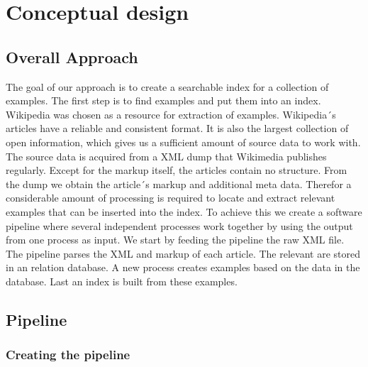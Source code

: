 
\chapter{Conceptual design}\label{cap_3}



\section{Overall Approach}

The goal of our approach is to create a searchable index for a collection of examples. The first step is to find examples and put them into an index. Wikipedia was chosen as a resource for extraction of examples. Wikipedia´s articles have a reliable and consistent format. It is also the largest collection of open information, which gives us a sufficient amount of source data to work with. The source data is acquired from a XML dump that Wikimedia publishes regularly. Except for the markup itself, the articles contain no structure. From the dump we obtain the article´s markup and additional meta data. Therefor a considerable amount of processing is required to locate and extract relevant examples that can be inserted into the index. To achieve this we create a software pipeline where several independent processes work together by using the output from one process as input. We start by feeding the pipeline the raw XML file. The pipeline parses the XML and markup of each article. The relevant are stored in an relation database. A new process creates examples based on the data in the database. Last an index is built from these examples.

\section{Pipeline} \label{cd_pipeline}

\subsection{Creating the pipeline} \label{custom-pipeline}

